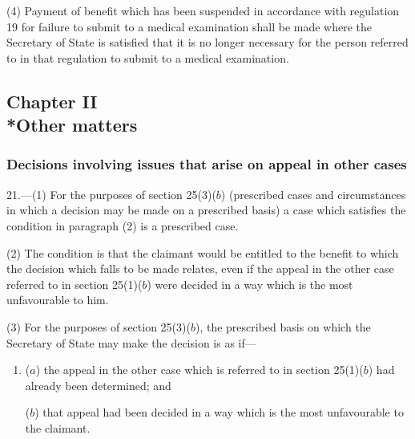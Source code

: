 \documentclass[12pt,a4paper]{article}
\begin{document}
(4) Payment of benefit which has been suspended in accordance with regulation 19 for failure to submit to a medical examination shall be made where the Secretary of State is satisfied that it is no longer necessary for the person referred to in that regulation to submit to a medical examination.


\subsection[Chapter II --- Other matters]{Chapter II\\*Other matters}

\subsubsection[21. Decisions involving issues that arise on appeal in other cases]{Decisions involving issues that arise on appeal in other cases}

\renewcommand\parthead{--- Part III Chapter II}

21.—(1) For the purposes of section 25(3)($b$) (prescribed cases and circumstances in which a decision may be made on a prescribed basis) a case which satisfies the condition in paragraph (2) is a prescribed case.

(2) The condition is that the claimant would be entitled to the benefit to which the decision which falls to be made relates, even if the appeal in the other case referred to in section 25(1)($b$) were decided in a way which is the most unfavourable to him.

(3) For the purposes of section 25(3)($b$), the prescribed basis on which the Secretary of State may make the decision is as if—
\begin{enumerate}\item[]
($a$) the appeal in the other case which is referred to in section 25(1)($b$) had already been determined; and

($b$) that appeal had been decided in a way which is the most unfavourable to the claimant.
\end{enumerate}
\end{document}
